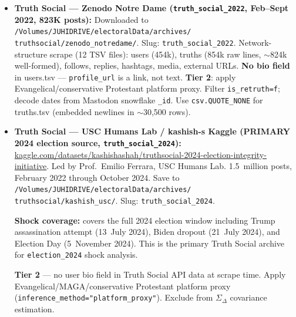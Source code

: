 \documentclass[11pt]{article}
\begin{document}
\begin{taskbox}
{\begin{itemize}[leftmargin=1.6em, itemsep=1pt]
    \item \textbf{Truth Social --- Zenodo Notre Dame (\texttt{truth\_social\_2022},
          Feb--Sept 2022, 823K posts):}
          Downloaded to \texttt{/Volumes/JUHIDRIVE/electoralData/archives/}\allowbreak
          \texttt{truthsocial/zenodo\_notredame/}. Slug: \texttt{truth\_social\_2022}.
          Network-structure scrape (12 TSV files): users (454k), truths (854k raw lines,
          $\sim$824k well-formed), follows, replies, hashtags, media, external URLs.
          \textbf{No bio field} in users.tsv --- \texttt{profile\_url} is a link,
          not text. \textbf{Tier 2}: apply Evangelical/conservative Protestant
          platform proxy. Filter \texttt{is\_retruth=f}; decode dates from
          Mastodon snowflake \texttt{\_id}. Use \texttt{csv.QUOTE\_NONE} for
          truths.tsv (embedded newlines in $\sim$30,500 rows).

    \item \textbf{Truth Social --- USC Humans Lab / kashish-s Kaggle
          (PRIMARY 2024 election source, \texttt{truth\_social\_2024}):}
          \url{kaggle.com/datasets/kashishashah/truthsocial-2024-election-integrity-initiative}.
          Led by Prof.\ Emilio Ferrara, USC Humans Lab.
          1.5~million posts, February 2022 through October 2024.
          Save to \texttt{/Volumes/JUHIDRIVE/electoralData/archives/}\allowbreak
          \texttt{truthsocial/kashish\_usc/}. Slug: \texttt{truth\_social\_2024}.

          \smallskip
          \textbf{Shock coverage:} covers the full 2024 election window including
          Trump assassination attempt (13~July 2024), Biden dropout (21~July 2024),
          and Election Day (5~November 2024). This is the primary Truth Social
          archive for \texttt{election\_2024} shock analysis.

          \smallskip
          \textbf{Tier 2} --- no user bio field in Truth Social API data at
          scrape time. Apply Evangelical/MAGA/conservative Protestant platform proxy
          (\texttt{inference\_method="platform\_proxy"}).
          Exclude from $\Sigma_\Delta$ covariance estimation.


\end{itemize}}
\end{taskbox}
\end{document}
